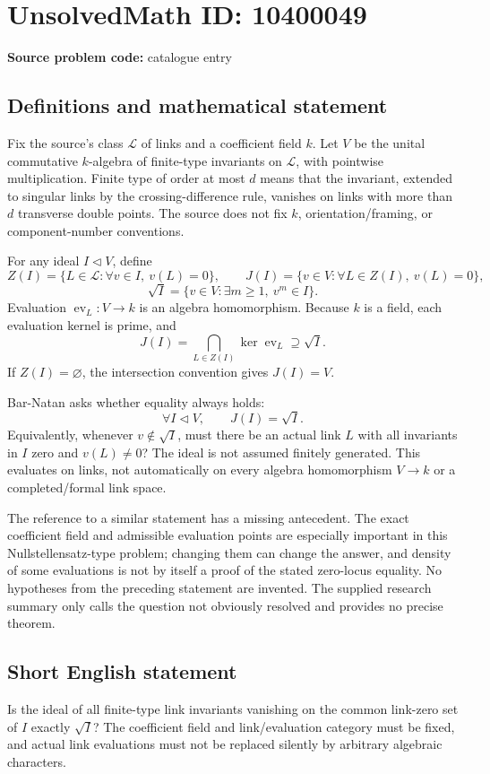 \documentclass[11pt]{article}
\begin{document}
\section*{UnsolvedMath ID: 10400049}
\textbf{Source problem code:} catalogue entry
\subsection{Definitions and mathematical statement}
Fix the source's class \(\mathcal L\) of links and a coefficient field \(k\). Let \(V\) be the unital commutative \(k\)-algebra of finite-type invariants on \(\mathcal L\), with pointwise multiplication. Finite type of order at most \(d\) means that the invariant, extended to singular links by the crossing-difference rule, vanishes on links with more than \(d\) transverse double points. The source does not fix \(k\), orientation/framing, or component-number conventions.

For any ideal \(I\lhd V\), define
\[
Z(I)=\{L\in\mathcal L:\forall v\in I,\ v(L)=0\},
\qquad
J(I)=\{v\in V:\forall L\in Z(I),\ v(L)=0\},
\]
\[
\sqrt I=\{v\in V:\exists m\ge1,\ v^m\in I\}.
\]
Evaluation \(\operatorname{ev}_L:V\to k\) is an algebra homomorphism. Because \(k\) is a field, each evaluation kernel is prime, and
\[
J(I)=\bigcap_{L\in Z(I)}\ker\operatorname{ev}_L
\supseteq\sqrt I.
\]
If \(Z(I)=\varnothing\), the intersection convention gives \(J(I)=V\).

Bar-Natan asks whether equality always holds:
\[
\forall I\lhd V,\qquad J(I)=\sqrt I.
\]
Equivalently, whenever \(v\notin\sqrt I\), must there be an actual link \(L\) with all invariants in \(I\) zero and \(v(L)\ne0\)? The ideal is not assumed finitely generated. This evaluates on links, not automatically on every algebra homomorphism \(V\to k\) or a completed/formal link space.

The reference to a similar statement has a missing antecedent. The exact coefficient field and admissible evaluation points are especially important in this Nullstellensatz-type problem; changing them can change the answer, and density of some evaluations is not by itself a proof of the stated zero-locus equality. No hypotheses from the preceding statement are invented. The supplied research summary only calls the question not obviously resolved and provides no precise theorem.
\subsection{Short English statement}
Is the ideal of all finite-type link invariants vanishing on the common link-zero set of \(I\) exactly \(\sqrt I\)? The coefficient field and link/evaluation category must be fixed, and actual link evaluations must not be replaced silently by arbitrary algebraic characters.
\end{document}
